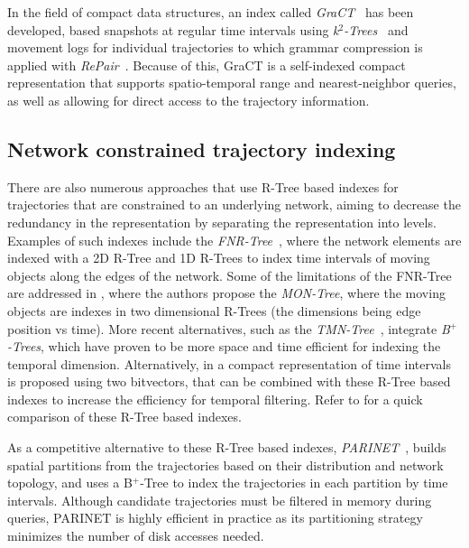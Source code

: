 \documentclass[a4paper,10pt,twoside]{book}
\begin{document}
    In the field of compact data structures, an index called {\em GraCT}~\cite{brisaboa2019gract} has been developed, based snapshots at regular time intervals using {\em k$^2$-Trees}~\cite{brisaboa2009k} and movement logs for individual trajectories to which grammar compression is applied with {\em RePair}~\cite{larsson2000off}. Because of this, GraCT is a self-indexed compact representation that supports spatio-temporal range and nearest-neighbor queries, as well as allowing for direct access to the trajectory information.
	
	\subsection{Network constrained trajectory indexing}
	There are also numerous approaches that use R-Tree based indexes for trajectories that are constrained to an underlying network, aiming to decrease the redundancy in the representation by separating the representation into levels. Examples of such indexes include the {\em FNR-Tree}~\cite{DBLP:conf/ssd/Frentzos03}, where the network elements are indexed with a 2D R-Tree and 1D R-Trees to index time intervals of moving objects along the edges of the network. Some of the limitations of the FNR-Tree are addressed in \cite{DBLP:journals/geoinformatica/AlmeidaG05}, where the authors propose the {\em MON-Tree}, where the moving objects are indexes in two dimensional R-Trees (the dimensions being edge position vs time). More recent alternatives, such as the {\em TMN-Tree}~\cite{chang2010tmn}, integrate {\em B$^+$-Trees}, which have proven to be more space and time efficient for indexing the temporal dimension. Alternatively, in \cite{rivera2018faster} a compact representation of time intervals is proposed using two bitvectors, that can be combined with these R-Tree based indexes to increase the efficiency for temporal filtering. Refer to \cite{john2017performance} for a quick comparison of these R-Tree based indexes.

    As a competitive alternative to these R-Tree based indexes, {\em PARINET}~\cite{DBLP:journals/vldb/PopaZOBV11}, builds spatial partitions from the trajectories based on their distribution and network topology, and uses a B$^+$-Tree to index the trajectories in each partition by time intervals. Although candidate trajectories must be filtered in memory during queries, PARINET is highly efficient in practice as its partitioning strategy minimizes the number of disk accesses needed.
    
\end{document}
